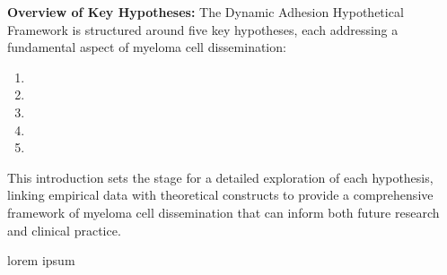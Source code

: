 \textbf{Overview of Key Hypotheses:}
The Dynamic Adhesion Hypothetical Framework is structured around five key
hypotheses, each addressing a fundamental aspect of myeloma cell dissemination:
\begin{enumerate}
      \item \caddpredictions
      \item \caddadaptation
      \item \caddadaptibility
      \item \cadddiversity
      \item \caddtrigger
\end{enumerate}

This introduction sets the stage for a detailed exploration of each hypothesis,
linking empirical data with theoretical constructs to provide a comprehensive
framework of myeloma cell dissemination that can inform both future research and
clinical practice.


\unnsubsection{\caddpredictionstitle}%
\label{sec:discussion_caddpredictions}%
lorem ipsum







